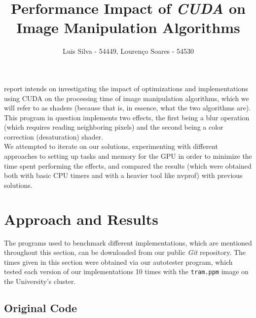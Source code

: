 \documentclass[10pt,journal,compsoc]{IEEEtran}
\def\code#1{\texttt{#1}}
\begin{document}
\title{Performance Impact of \textit{CUDA} on Image Manipulation Algorithms}

\author{Luis Silva - 54449,
        Lourenço Soares - 54530%
}


\maketitle


 report intends on investigating the impact of optimizations and implementations using CUDA on the processing time of image manipulation algorithms, which we will refer to as shaders (because that is, in essence, what the two algorithms are). This program in question implements two effects, the first being a blur operation (which requires reading neighboring pixels) and the second being a color correction (desaturation) shader. \\

\noindent We attempted to iterate on our solutions, experimenting with different approaches to setting up tasks and memory for the GPU in order to minimize the time spent performing the effects, and compared the results (which were obtained both with basic CPU timers and with a heavier tool like nvprof) with previous solutions. 


\section{Approach and Results}

\noindent The programs used to benchmark different implementations, which are mentioned throughout this section, can be downloaded from our public \textit{Git} repository\cite{projectrepo}. The times given in this section were obtained via our autotester program, which tested each version of our implementations 10 times with the \code{tram.ppm} image on the University's cluster.


\subsection{Original Code}
\end{document}
